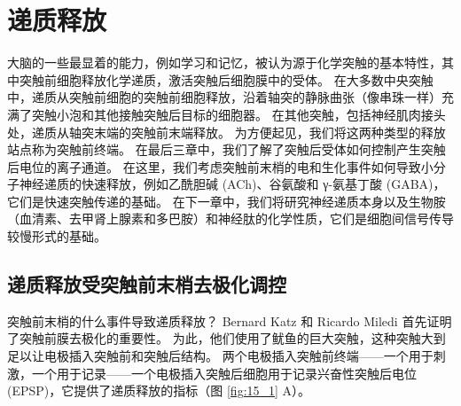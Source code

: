 \chapter{递质释放} \label{chap:chap15}
大脑的一些最显着的能力，例如学习和记忆，被认为源于化学突触的基本特性，其中突触前细胞释放化学递质，激活突触后细胞膜中的受体。
在大多数中央突触中，递质从突触前细胞的突触前细胞释放，沿着轴突的静脉曲张（像串珠一样）充满了突触小泡和其他接触突触后目标的细胞器。 
在其他突触，包括神经肌肉接头处，递质从轴突末端的突触前末端释放。 
为方便起见，我们将这两种类型的释放站点称为突触前终端。 
在最后三章中，我们了解了突触后受体如何控制产生突触后电位的离子通道。 
在这里，我们考虑突触前末梢的电和生化事件如何导致小分子神经递质的快速释放，例如乙酰胆碱 (ACh)、谷氨酸和 γ-氨基丁酸 (GABA)，它们是快速突触传递的基础。 
在下一章中，我们将研究神经递质本身以及生物胺（血清素、去甲肾上腺素和多巴胺）和神经肽的化学性质，它们是细胞间信号传导较慢形式的基础。



\section{递质释放受突触前末梢去极化调控}

突触前末梢的什么事件导致递质释放？ 
Bernard Katz 和 Ricardo Miledi 首先证明了突触前膜去极化的重要性。 
为此，他们使用了鱿鱼的巨大突触，这种突触大到足以让电极插入突触前和突触后结构。 
两个电极插入突触前终端——一个用于刺激，一个用于记录——一个电极插入突触后细胞用于记录兴奋性突触后电位 (EPSP)，它提供了递质释放的指标（图 \ref{fig:15_1} A）。

